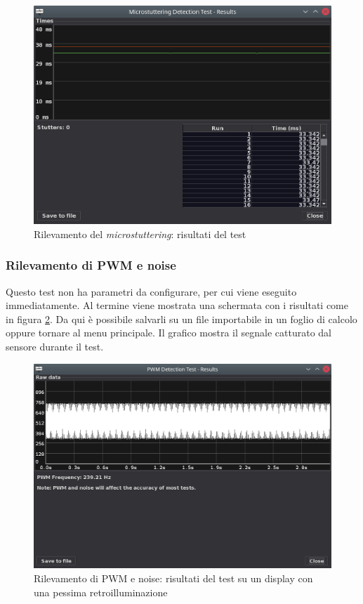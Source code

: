 \begin{figure}[H]
	\centering
	\includegraphics[width=\textwidth]{Applicazione_files/gui_microstuttering_results.png}
	\caption{Rilevamento del \textit{microstuttering}: risultati del test}
	\label{fig:gui_microstuttering_results}
\end{figure}

\subsubsection{Rilevamento di PWM e noise}
Questo test non ha parametri da configurare, per cui viene eseguito immediatamente. Al termine viene mostrata una schermata con i risultati come in figura \ref{fig:gui_pwm_results}. Da qui è possibile salvarli su un file importabile in un foglio di calcolo oppure tornare al menu principale. Il grafico mostra il segnale catturato dal sensore durante il test.

\begin{figure}[H]
	\centering
	\includegraphics[width=\textwidth]{Applicazione_files/gui_pwm_results.png}
	\caption{Rilevamento di PWM e noise: risultati del test su un display con una pessima retroilluminazione}
	\label{fig:gui_pwm_results}
\end{figure}

